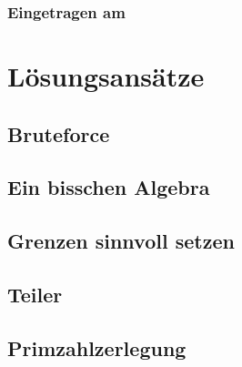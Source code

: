 \documentclass[10pt, fleqn]{article}
\begin{document}
\subsubsection*{Eingetragen am}

\newpage

\section{Lösungsansätze}

\subsection{Bruteforce}

\subsection{Ein bisschen Algebra}

\subsection{Grenzen sinnvoll setzen}

\subsection{Teiler}

\subsection{Primzahlzerlegung}
\end{document}
